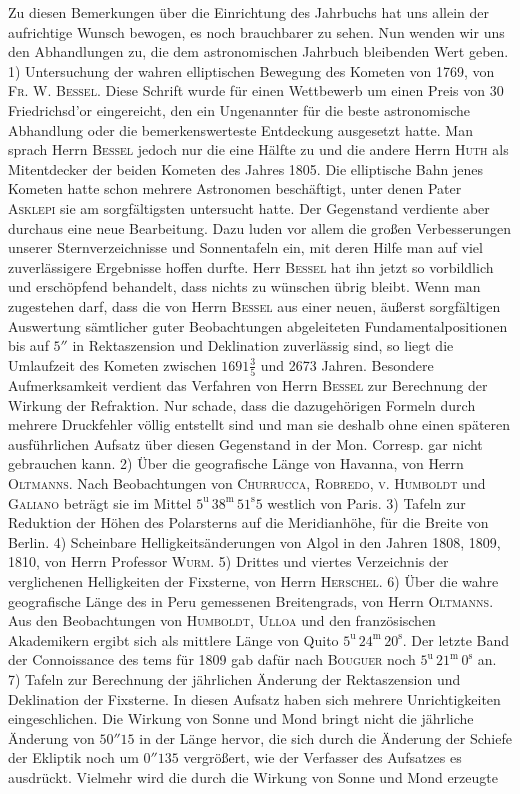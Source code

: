 Zu diesen Bemerkungen über die Einrichtung des Jahrbuchs hat uns allein der aufrichtige Wunsch bewogen, es noch brauchbarer zu sehen. Nun wenden wir uns den Abhandlungen zu, die dem astronomischen Jahrbuch bleibenden Wert geben. 1) Untersuchung der wahren elliptischen Bewegung des Kometen von 1769, von \textsc{Fr. W. Bessel}. Diese Schrift wurde für einen Wettbewerb um einen Preis von 30 Friedrichsd’or eingereicht, den ein Ungenannter für die beste astronomische Abhandlung oder die bemerkenswerteste Entdeckung ausgesetzt hatte. Man sprach Herrn \textsc{Bessel} jedoch nur die eine Hälfte zu und die andere Herrn \textsc{Huth} als Mitentdecker der beiden Kometen des Jahres 1805. Die elliptische Bahn jenes Kometen hatte schon mehrere Astronomen beschäftigt, unter denen Pater \textsc{Asklepi} sie am sorgfältigsten untersucht hatte. Der Gegenstand verdiente aber durchaus eine neue Bearbeitung. Dazu luden vor allem die großen Verbesserungen unserer Sternverzeichnisse und Sonnentafeln ein, mit deren Hilfe man auf viel zuverlässigere Ergebnisse hoffen durfte. Herr \textsc{Bessel} hat ihn jetzt so vorbildlich und erschöpfend behandelt, dass nichts zu wünschen übrig bleibt. Wenn man zugestehen darf, dass die von Herrn \textsc{Bessel} aus einer neuen, äußerst sorgfältigen Auswertung sämtlicher guter Beobachtungen abgeleiteten Fundamentalpositionen bis auf $5''$ in Rektaszension und Deklination zuverlässig sind, so liegt die Umlaufzeit des Kometen zwischen $1691\frac{3}{5}$ und 2673 Jahren. Besondere Aufmerksamkeit verdient das Verfahren von Herrn \textsc{Bessel} zur Berechnung der Wirkung der Refraktion. Nur schade, dass die dazugehörigen Formeln durch mehrere Druckfehler völlig entstellt sind und man sie deshalb ohne einen späteren ausführlichen Aufsatz über diesen Gegenstand in der Mon. Corresp. gar nicht gebrauchen kann. 2) Über die geografische Länge von Havanna, von Herrn \textsc{Oltmanns}. Nach Beobachtungen von \textsc{Churrucca}, \textsc{Robredo}, \textsc{v. Humboldt} und \textsc{Galiano} beträgt sie im Mittel $5^{\mathrm u}\,38^{\mathrm m}\,51^{\mathrm s}5$ westlich von Paris. 3) Tafeln zur Reduktion der Höhen des Polarsterns auf die Meridianhöhe, für die Breite von Berlin. 4) Scheinbare Helligkeitsänderungen von Algol in den Jahren 1808, 1809, 1810, von Herrn Professor \textsc{Wurm}. 5) Drittes und viertes Verzeichnis der verglichenen Helligkeiten der Fixsterne, von Herrn \textsc{Herschel}. 6) Über die wahre geografische Länge des in Peru gemessenen Breitengrads, von Herrn \textsc{Oltmanns}. Aus den Beobachtungen von \textsc{Humboldt}, \textsc{Ulloa} und den französischen Akademikern ergibt sich als mittlere Länge von Quito $5^{\mathrm u}\,24^{\mathrm m}\,20^{\mathrm s}$. Der letzte Band der Connoissance des tems für 1809 gab dafür nach \textsc{Bouguer} noch $5^{\mathrm u}\,21^{\mathrm m}\,0^{\mathrm s}$ an. 7) Tafeln zur Berechnung der jährlichen Änderung der Rektaszension und Deklination der Fixsterne. In diesen Aufsatz haben sich mehrere Unrichtigkeiten eingeschlichen. Die Wirkung von Sonne und Mond bringt nicht die jährliche Änderung von $50''15$ in der Länge hervor, die sich durch die Änderung der Schiefe der Ekliptik noch um $0''135$ vergrößert, wie der Verfasser des Aufsatzes es ausdrückt. Vielmehr wird die durch die Wirkung von Sonne und Mond erzeugte 